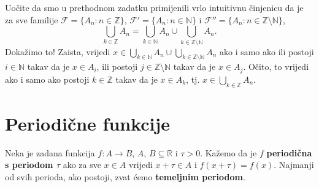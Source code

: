 \begin{remark}
Uočite da smo u prethodnom zadatku primijenili vrlo intuitivnu činjenicu da je za sve familije $\mathcal{F}=\{A_n : n\in \mathbb{Z}\}$, $\mathcal{F}'=\{A_n : n\in \mathbb{N}\}$ i $\mathcal{F}''=\{A_n : n\in \mathbb{Z}\setminus\mathbb{N}\}$,
$$\bigcup_{k\in \mathbb{Z}}{A_n}=\bigcup_{k\in \mathbb{N}}{A_n}\cup \bigcup_{k\in \mathbb{Z}\setminus\mathbb{N}}{A_n}.$$
Dokažimo to! Zaista, vrijedi $\displaystyle x\in \bigcup_{k\in \mathbb{N}}{A_n}\cup \bigcup_{k\in \mathbb{Z}\setminus\mathbb{N}}{A_n}$ ako i samo ako ili postoji $i\in \mathbb{N}$ takav da je $x\in A_i$, ili postoji $j\in \mathbb{Z}\setminus\mathbb{N}$ takav da je $x\in A_j$. Očito, to vrijedi ako i samo ako postoji $k\in \mathbb{Z}$ takav da je $x\in A_k$, tj. $\displaystyle x\in \bigcup_{k\in \mathbb{Z}}{A_n}$.
\end{remark}

\section{Periodične funkcije}

\begin{definition}
Neka je zadana funkcija $f : A\to B$, $A$, $B\subseteq \mathbb{R}$ i $\tau>0$. Kažemo da je $f$ \textbf{periodična s periodom $\tau$} ako za sve $x\in A$ vrijedi $x+\tau \in A$ i $f(x+\tau)=f(x)$. Najmanji od svih perioda, ako postoji, zvat ćemo \textbf{temeljnim periodom}.
\end{definition}

